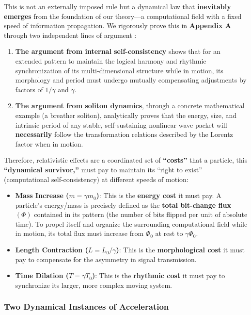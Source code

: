 \documentclass[11pt, a4paper]{article}
\begin{document}
\begin{itemize}
    This is not an externally imposed rule but a dynamical law that \textbf{inevitably emerges} from the foundation of our theory—a computational field with a fixed speed of information propagation. We rigorously prove this in \textbf{Appendix A} through two independent lines of argument \cite{DrazinJohnson1989}:
    \begin{enumerate}
        \item \textbf{The argument from internal self-consistency} shows that for an extended pattern to maintain the logical harmony and rhythmic synchronization of its multi-dimensional structure while in motion, its morphology and period must undergo mutually compensating adjustments by factors of $1/\gamma$ and $\gamma$.
        \item \textbf{The argument from soliton dynamics}, through a concrete mathematical example (a breather soliton), analytically proves that the energy, size, and intrinsic period of any stable, self-sustaining nonlinear wave packet will \textbf{necessarily} follow the transformation relations described by the Lorentz factor when in motion.
    \end{enumerate}

    Therefore, relativistic effects are a coordinated set of \textbf{``costs''} that a particle, this \textbf{``dynamical survivor,''} must pay to maintain its ``right to exist'' (computational self-consistency) at different speeds of motion:
    \begin{itemize}
        \item \textbf{Mass Increase ($m = \gamma m_0$)}: This is the \textbf{energy cost} it must pay. A particle's energy/mass is precisely defined as the \textbf{total bit-change flux $(\Phi)$} contained in its pattern (the number of bits flipped per unit of absolute time). To propel itself and organize the surrounding computational field while in motion, its total flux must increase from $\Phi_0$ at rest to $\gamma\Phi_0$.
        \item \textbf{Length Contraction ($L = L_0/\gamma$)}: This is the \textbf{morphological cost} it must pay to compensate for the asymmetry in signal transmission.
        \item \textbf{Time Dilation ($T = \gamma T_0$)}: This is the \textbf{rhythmic cost} it must pay to synchronize its larger, more complex moving system.
    \end{itemize}
\end{itemize}

\subsubsection*{Two Dynamical Instances of Acceleration}
\end{document}
